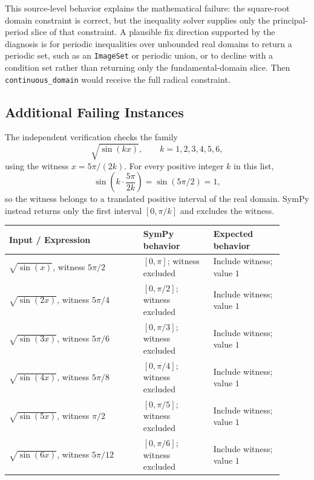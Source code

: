 \documentclass[11pt]{article}
\begin{document}
This source-level behavior explains the mathematical failure: the square-root
domain constraint is correct, but the inequality solver supplies only the
principal-period slice of that constraint. A plausible fix direction supported
by the diagnosis is for periodic inequalities over unbounded real domains to
return a periodic set, such as an \texttt{ImageSet} or periodic union, or to
decline with a condition set rather than returning only the fundamental-domain
slice. Then \nolinkurl{continuous_domain} would receive the full radical
constraint.

\subsection{Additional Failing Instances}

The independent verification checks the family
\[
  \sqrt{\sin(kx)},\qquad k=1,2,3,4,5,6,
\]
using the witness \(x=5\pi/(2k)\). For every positive integer \(k\) in this
list,
\[
  \sin\!\left(k\cdot\frac{5\pi}{2k}\right)=\sin(5\pi/2)=1,
\]
so the witness belongs to a translated positive interval of the real domain.
SymPy instead returns only the first interval \([0,\pi/k]\) and excludes the
witness.

\begin{center}
\small
\renewcommand{\arraystretch}{1.3}
\begin{tabular}{@{}>{\raggedright\arraybackslash}p{0.44\linewidth}>{\raggedright\arraybackslash}p{0.23\linewidth}>{\raggedright\arraybackslash}p{0.23\linewidth}@{}}
\toprule
\textbf{Input / Expression} & \textbf{SymPy behavior} & \textbf{Expected behavior} \\
\midrule
\(\sqrt{\sin(x)}\), witness \(5\pi/2\) & \([0,\pi]\); witness excluded & Include witness; value \(1\) \\
\(\sqrt{\sin(2x)}\), witness \(5\pi/4\) & \([0,\pi/2]\); witness excluded & Include witness; value \(1\) \\
\(\sqrt{\sin(3x)}\), witness \(5\pi/6\) & \([0,\pi/3]\); witness excluded & Include witness; value \(1\) \\
\(\sqrt{\sin(4x)}\), witness \(5\pi/8\) & \([0,\pi/4]\); witness excluded & Include witness; value \(1\) \\
\(\sqrt{\sin(5x)}\), witness \(\pi/2\) & \([0,\pi/5]\); witness excluded & Include witness; value \(1\) \\
\(\sqrt{\sin(6x)}\), witness \(5\pi/12\) & \([0,\pi/6]\); witness excluded & Include witness; value \(1\) \\
\bottomrule
\end{tabular}
\end{center}
\end{document}
